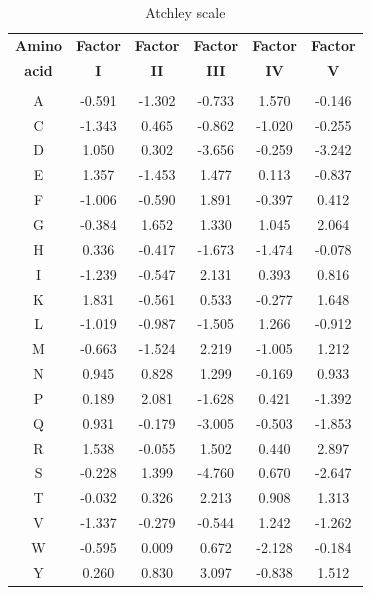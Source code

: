 \begin{table}[h!]
    \centering
    \setlength{\tabcolsep}{1.2em}
    \fontsize{12pt}{12pt}\selectfont
    \begin{tabular}{c c c c c c}
        \textbf{Amino} & \textbf{Factor} & \textbf{Factor} & \textbf{Factor} & \textbf{Factor} & \textbf{Factor} \\
        \textbf{acid} & \textbf{I} & \textbf{II} & \textbf{III} & \textbf{IV} & \textbf{V} \\
        \hline
        \\
         A & -0.591 & -1.302 & -0.733 & 1.570 & -0.146 \\ 
         C & -1.343 & 0.465 & -0.862 & -1.020 & -0.255 \\
         D & 1.050 & 0.302 & -3.656 & -0.259 & -3.242 \\
         E & 1.357 & -1.453 & 1.477 & 0.113 & -0.837 \\
         F & -1.006 & -0.590 & 1.891 & -0.397 & 0.412 \\
         G & -0.384 & 1.652 & 1.330 & 1.045 & 2.064 \\
         H & 0.336 & -0.417 & -1.673 & -1.474 & -0.078 \\
         I & -1.239 & -0.547 & 2.131 & 0.393 & 0.816 \\
         K & 1.831 & -0.561 & 0.533 & -0.277 & 1.648 \\
         L & -1.019 & -0.987 & -1.505 & 1.266 & -0.912 \\
         M & -0.663 & -1.524 & 2.219 & -1.005 & 1.212 \\
         N & 0.945 & 0.828 & 1.299 & -0.169 & 0.933 \\
         P & 0.189 & 2.081 & -1.628 & 0.421 & -1.392 \\
         Q & 0.931 & -0.179 & -3.005 & -0.503 & -1.853 \\
         R & 1.538 & -0.055 & 1.502 & 0.440 & 2.897 \\
         S & -0.228 & 1.399 & -4.760 & 0.670 & -2.647 \\
         T & -0.032 & 0.326 & 2.213 & 0.908 & 1.313 \\
         V & -1.337 & -0.279 & -0.544 & 1.242 & -1.262 \\
         W & -0.595 & 0.009 & 0.672 & -2.128 & -0.184 \\
         Y & 0.260 & 0.830 & 3.097 & -0.838 & 1.512 \\
    \end{tabular}
    \caption{Atchley scale}
\end{table}

